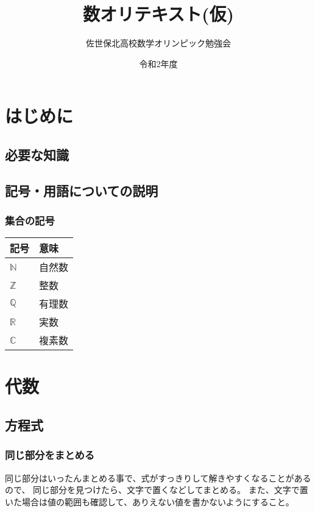 \documentclass[uplatex,fleqn]{jsbook}
\begin{document}
\title{数オリテキスト(仮)}
\author{佐世保北高校数学オリンピック勉強会}
\date{令和2年度}
\maketitle

\chapter{はじめに}
\section{必要な知識}
\section{記号・用語についての説明}
\subsection{集合の記号}
\begin{table}[h]
    \begin{tabular}{ll}
        記号 & 意味\\\hline\hline
        $\mathbb{N}$ & 自然数\\
        $\mathbb{Z}$ & 整数\\
        $\mathbb{Q}$ & 有理数\\
        $\mathbb{R}$ & 実数\\
        $\mathbb{C}$ & 複素数\\\hline
    \end{tabular}
\end{table}
\subsection{}

\chapter{代数}
\section{方程式}
\subsection{同じ部分をまとめる}
同じ部分はいったんまとめる事で、式がすっきりして解きやすくなることがあるので、
同じ部分を見つけたら、文字で置くなどしてまとめる。
また、文字で置いた場合は値の範囲も確認して、ありえない値を書かないようにすること。
\end{document}
